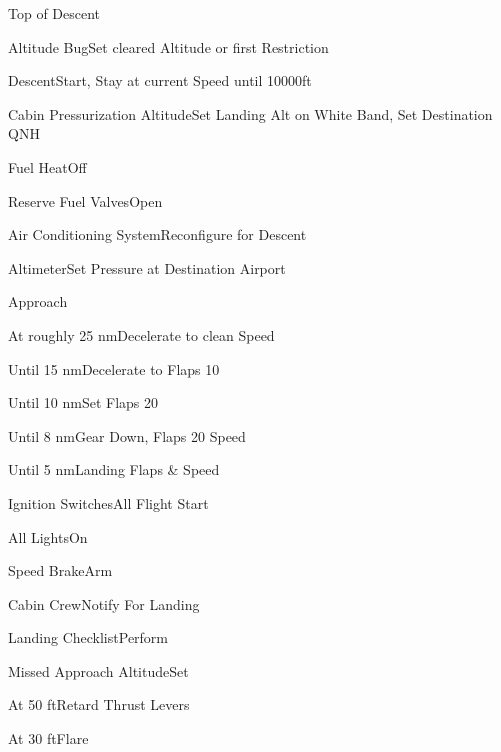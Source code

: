 \documentclass[sim-use, blue_items]{checklist}
\begin{document}
\begin{checklist}{Top of Descent}
	\item{Altitude Bug}{Set cleared Altitude or first Restriction}
	\item{Descent}{Start, Stay at current Speed until 10000ft}
	\item{Cabin Pressurization Altitude}{Set Landing Alt on White Band, Set Destination QNH}
	\item{Fuel Heat}{Off}
	\item{Reserve Fuel Valves}{Open}
	\item{Air Conditioning System}{Reconfigure for Descent}
	 {
		\item{Altimeter}{Set Pressure at Destination Airport}
	}
\end{checklist}

\begin{checklist}{Approach}
	\item{At roughly 25 nm}{Decelerate to clean Speed}
	\item{Until 15 nm}{Decelerate to Flaps 10}
	\item{Until 10 nm}{Set Flaps 20}
	\item{Until 8 nm}{Gear Down, Flaps 20 Speed}
	\item{Until 5 nm}{Landing Flaps \& Speed}
	\item{Ignition Switches}{All Flight Start}
	\item{All Lights}{On}
	\item{Speed Brake}{Arm}
	\item{Cabin Crew}{Notify For Landing}
	\item{Landing Checklist}{Perform}
	 {
		\item{Missed Approach Altitude}{Set}
	}
	\item{At 50 ft}{Retard Thrust Levers}
	\item{At 30 ft}{Flare}
\end{checklist}
\end{document}
